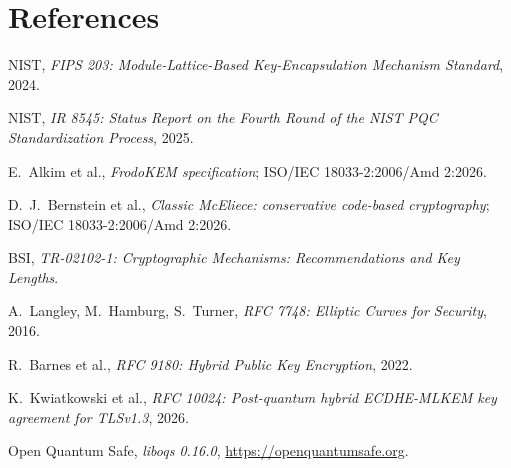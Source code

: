 \documentclass[11pt,a4paper]{article}
\begin{document}
\section*{References}
\footnotesize
\begin{enumerate}[label={[\arabic*]},leftmargin=2em,itemsep=0pt]
  \item NIST, \emph{FIPS 203: Module-Lattice-Based Key-Encapsulation Mechanism Standard}, 2024.
  \item NIST, \emph{IR 8545: Status Report on the Fourth Round of the NIST PQC Standardization Process}, 2025.
  \item E.~Alkim et al., \emph{FrodoKEM specification}; ISO/IEC 18033-2:2006/Amd 2:2026.
  \item D.~J.~Bernstein et al., \emph{Classic McEliece: conservative code-based cryptography}; ISO/IEC 18033-2:2006/Amd 2:2026.
  \item BSI, \emph{TR-02102-1: Cryptographic Mechanisms: Recommendations and Key Lengths}.
  \item A.~Langley, M.~Hamburg, S.~Turner, \emph{RFC 7748: Elliptic Curves for Security}, 2016.
  \item R.~Barnes et al., \emph{RFC 9180: Hybrid Public Key Encryption}, 2022.
  \item K.~Kwiatkowski et al., \emph{RFC 10024: Post-quantum hybrid ECDHE-MLKEM key agreement for TLSv1.3}, 2026.
  \item Open Quantum Safe, \emph{liboqs 0.16.0}, \url{https://openquantumsafe.org}.
\end{enumerate}
\end{document}
